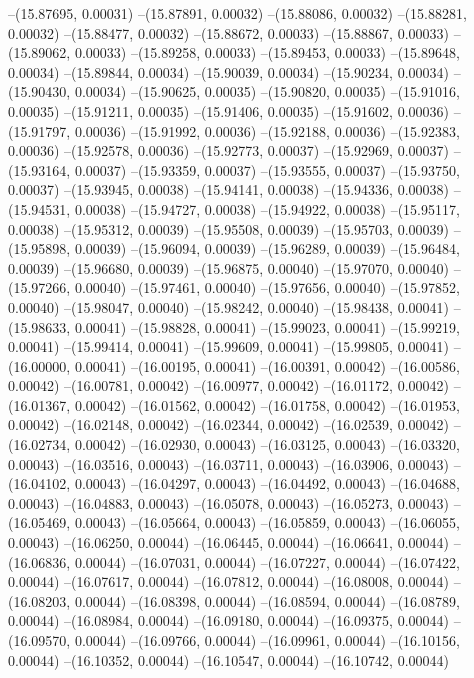 --(15.87695, 0.00031)
--(15.87891, 0.00032)
--(15.88086, 0.00032)
--(15.88281, 0.00032)
--(15.88477, 0.00032)
--(15.88672, 0.00033)
--(15.88867, 0.00033)
--(15.89062, 0.00033)
--(15.89258, 0.00033)
--(15.89453, 0.00033)
--(15.89648, 0.00034)
--(15.89844, 0.00034)
--(15.90039, 0.00034)
--(15.90234, 0.00034)
--(15.90430, 0.00034)
--(15.90625, 0.00035)
--(15.90820, 0.00035)
--(15.91016, 0.00035)
--(15.91211, 0.00035)
--(15.91406, 0.00035)
--(15.91602, 0.00036)
--(15.91797, 0.00036)
--(15.91992, 0.00036)
--(15.92188, 0.00036)
--(15.92383, 0.00036)
--(15.92578, 0.00036)
--(15.92773, 0.00037)
--(15.92969, 0.00037)
--(15.93164, 0.00037)
--(15.93359, 0.00037)
--(15.93555, 0.00037)
--(15.93750, 0.00037)
--(15.93945, 0.00038)
--(15.94141, 0.00038)
--(15.94336, 0.00038)
--(15.94531, 0.00038)
--(15.94727, 0.00038)
--(15.94922, 0.00038)
--(15.95117, 0.00038)
--(15.95312, 0.00039)
--(15.95508, 0.00039)
--(15.95703, 0.00039)
--(15.95898, 0.00039)
--(15.96094, 0.00039)
--(15.96289, 0.00039)
--(15.96484, 0.00039)
--(15.96680, 0.00039)
--(15.96875, 0.00040)
--(15.97070, 0.00040)
--(15.97266, 0.00040)
--(15.97461, 0.00040)
--(15.97656, 0.00040)
--(15.97852, 0.00040)
--(15.98047, 0.00040)
--(15.98242, 0.00040)
--(15.98438, 0.00041)
--(15.98633, 0.00041)
--(15.98828, 0.00041)
--(15.99023, 0.00041)
--(15.99219, 0.00041)
--(15.99414, 0.00041)
--(15.99609, 0.00041)
--(15.99805, 0.00041)
--(16.00000, 0.00041)
--(16.00195, 0.00041)
--(16.00391, 0.00042)
--(16.00586, 0.00042)
--(16.00781, 0.00042)
--(16.00977, 0.00042)
--(16.01172, 0.00042)
--(16.01367, 0.00042)
--(16.01562, 0.00042)
--(16.01758, 0.00042)
--(16.01953, 0.00042)
--(16.02148, 0.00042)
--(16.02344, 0.00042)
--(16.02539, 0.00042)
--(16.02734, 0.00042)
--(16.02930, 0.00043)
--(16.03125, 0.00043)
--(16.03320, 0.00043)
--(16.03516, 0.00043)
--(16.03711, 0.00043)
--(16.03906, 0.00043)
--(16.04102, 0.00043)
--(16.04297, 0.00043)
--(16.04492, 0.00043)
--(16.04688, 0.00043)
--(16.04883, 0.00043)
--(16.05078, 0.00043)
--(16.05273, 0.00043)
--(16.05469, 0.00043)
--(16.05664, 0.00043)
--(16.05859, 0.00043)
--(16.06055, 0.00043)
--(16.06250, 0.00044)
--(16.06445, 0.00044)
--(16.06641, 0.00044)
--(16.06836, 0.00044)
--(16.07031, 0.00044)
--(16.07227, 0.00044)
--(16.07422, 0.00044)
--(16.07617, 0.00044)
--(16.07812, 0.00044)
--(16.08008, 0.00044)
--(16.08203, 0.00044)
--(16.08398, 0.00044)
--(16.08594, 0.00044)
--(16.08789, 0.00044)
--(16.08984, 0.00044)
--(16.09180, 0.00044)
--(16.09375, 0.00044)
--(16.09570, 0.00044)
--(16.09766, 0.00044)
--(16.09961, 0.00044)
--(16.10156, 0.00044)
--(16.10352, 0.00044)
--(16.10547, 0.00044)
--(16.10742, 0.00044)
